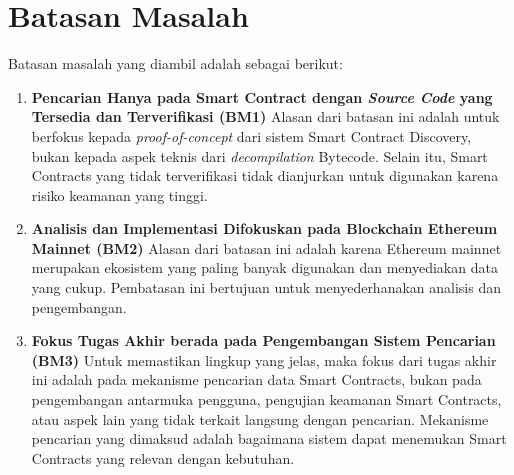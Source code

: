\section{Batasan Masalah}
\label{sec:batasan-masalah}


Batasan masalah yang diambil adalah sebagai berikut:

\begin{enumerate}
	\item \textbf{Pencarian Hanya pada Smart Contract dengan \textit{Source Code} yang Tersedia dan Terverifikasi (BM1)} \newline
	      Alasan dari batasan ini adalah untuk berfokus kepada \textit{proof-of-concept} dari sistem Smart Contract Discovery, bukan kepada aspek teknis dari \textit{decompilation} Bytecode. Selain itu, Smart Contracts yang tidak terverifikasi tidak dianjurkan untuk digunakan karena risiko keamanan yang tinggi.
	\item \textbf{Analisis dan Implementasi Difokuskan pada Blockchain Ethereum Mainnet (BM2)} \newline
	      Alasan dari batasan ini adalah karena Ethereum mainnet merupakan ekosistem yang paling banyak digunakan dan menyediakan data yang cukup. Pembatasan ini bertujuan untuk menyederhanakan analisis dan pengembangan.
	\item \textbf{Fokus Tugas Akhir berada pada Pengembangan Sistem Pencarian (BM3)} \newline
	      Untuk memastikan lingkup yang jelas, maka fokus dari tugas akhir ini adalah pada mekanisme pencarian data Smart Contracts, bukan pada pengembangan antarmuka pengguna, pengujian keamanan Smart Contracts, atau aspek lain yang tidak terkait langsung dengan pencarian. Mekanisme pencarian yang dimaksud adalah bagaimana sistem dapat menemukan Smart Contracts yang relevan dengan kebutuhan.
\end{enumerate}